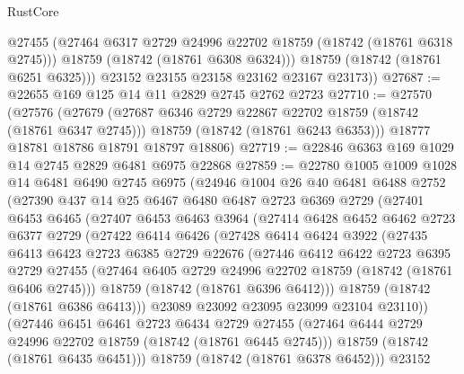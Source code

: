 \begin{lexlean}{RustCore}
\begin{coremodule}
            @27455
            (@27464 @6317 @2729 @24996 @22702 @18759 (@18742 (@18761 @6318 @2745)))
            @18759
            (@18742 (@18761 @6308 @6324)))
          @18759
          (@18742 (@18761 @6251 @6325)))
        @23152
        @23155
        @23158
        @23162
        @23167
        @23173))
@27687 := @22655 @169 @125 @14 @11 @2829 @2745 @2762 @2723
@27710 := @27570
    (@27576
      (@27679
        (@27687 @6346 @2729 @22867 @22702 @18759 (@18742 (@18761 @6347 @2745)))
        @18759
        (@18742 (@18761 @6243 @6353)))
      @18777
      @18781
      @18786
      @18791
      @18797
      @18806)
@27719 := @22846 @6363 @169 @1029 @14 @2745 @2829 @6481 @6975 @22868
@27859 := @22780
    @1005
    @1009
    @1028
    @14
    @6481
    @6490
    @2745
    @6975
    (@24946
      @1004
      @26
      @40
      @6481
      @6488
      @2752
      (@27390
        @437
        @14
        @25
        @6467
        @6480
        @6487
        @2723
        @6369
        @2729
        (@27401
          @6453
          @6465
          (@27407
            @6453
            @6463
            @3964
            (@27414
              @6428
              @6452
              @6462
              @2723
              @6377
              @2729
              (@27422
                @6414
                @6426
                (@27428
                  @6414
                  @6424
                  @3922
                  (@27435
                    @6413
                    @6423
                    @2723
                    @6385
                    @2729
                    @22676
                    (@27446
                      @6412
                      @6422
                      @2723
                      @6395
                      @2729
                      @27455
                      (@27464 @6405 @2729 @24996 @22702 @18759 (@18742 (@18761 @6406 @2745)))
                      @18759
                      (@18742 (@18761 @6396 @6412)))
                    @18759
                    (@18742 (@18761 @6386 @6413)))
                  @23089
                  @23092
                  @23095
                  @23099
                  @23104
                  @23110))
              (@27446
                @6451
                @6461
                @2723
                @6434
                @2729
                @27455
                (@27464 @6444 @2729 @24996 @22702 @18759 (@18742 (@18761 @6445 @2745)))
                @18759
                (@18742 (@18761 @6435 @6451)))
              @18759
              (@18742 (@18761 @6378 @6452)))
            @23152

\end{coremodule}
\end{lexlean}
